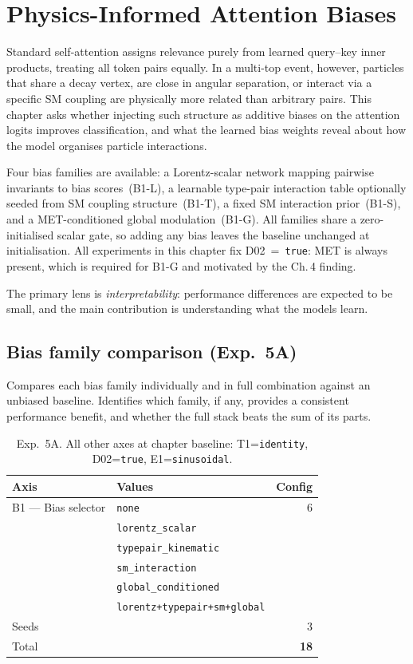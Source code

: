 \chapter{Physics-Informed Attention Biases}

Standard self-attention assigns relevance purely from learned query--key
inner products, treating all token pairs equally. In a multi-top event,
however, particles that share a decay vertex, are close in angular
separation, or interact via a specific SM coupling are physically more
related than arbitrary pairs. This chapter asks whether injecting such
structure as additive biases on the attention logits improves
classification, and what the learned bias weights reveal about how the
model organises particle interactions.

Four bias families are available: a Lorentz-scalar network mapping
pairwise invariants to bias scores~(B1-L), a learnable type-pair
interaction table optionally seeded from SM coupling structure~(B1-T),
a fixed SM interaction prior~(B1-S), and a MET-conditioned global
modulation~(B1-G). All families share a zero-initialised scalar gate,
so adding any bias leaves the baseline unchanged at initialisation.
All experiments in this chapter fix D02~=~\texttt{true}: MET is always
present, which is required for B1-G and motivated by the Ch.\,4 finding.

The primary lens is \textit{interpretability}: performance differences
are expected to be small, and the main contribution is understanding
what the models learn.

\section{Bias family comparison (Exp.\ 5A)}

Compares each bias family individually and in full combination against
an unbiased baseline. Identifies which family, if any, provides a
consistent performance benefit, and whether the full stack beats the
sum of its parts.

\begin{table}[h]
\centering\small
\begin{tabular}{llr}
\toprule
Axis & Values & Config \\
\midrule
B1 — Bias selector & \texttt{none} & 6 \\
 & \texttt{lorentz\_scalar} & \\
 & \texttt{typepair\_kinematic} & \\
 & \texttt{sm\_interaction} & \\
 & \texttt{global\_conditioned} & \\
 & \texttt{lorentz+typepair+sm+global} & \\
Seeds & & 3 \\
\midrule
Total & & \textbf{18} \\
\bottomrule
\end{tabular}
\caption{Exp.\ 5A. All other axes at chapter baseline:
T1=\texttt{identity}, D02=\texttt{true}, E1=\texttt{sinusoidal}.}
\end{table}

